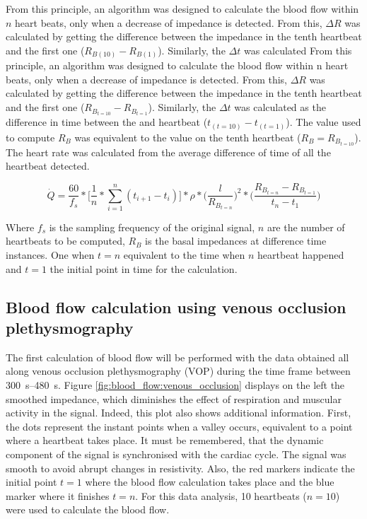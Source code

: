 From this principle, an algorithm was designed to calculate the blood flow within $n$ heart beats, only when a decrease of impedance is detected. From this, $\Delta R$ was calculated by getting the difference between the impedance in the tenth heartbeat and the first one ($R_{B(10)} - R_{B(1)}$).  Similarly, the $\Delta t$ was calculated From this principle, an algorithm was designed to calculate the blood flow within n heart beats, only when a decrease of impedance is detected. From this, $\Delta R$ was calculated by getting the difference between the impedance in the tenth heartbeat and the first one ($R_{B_{t=10}} - R_{B_{t=1}}$).  Similarly, the $\Delta t$ was calculated as the difference in time between the   and  heartbeat ($t_{(t=10)} - t_{(t=1)}$). The value used to compute $R_B$ was equivalent to the value on the tenth heartbeat ($R_B = R_{B_{t=10}}$). The heart rate was calculated from the average difference of time of all the heartbeat detected.

\begin{equation}
\label{eq:QL}
\dot{Q} = \frac{60}{f_s}*\Bigg[\frac{1}{n}*\sum_{i=1}^{n}(t_{i+1} - t_{i}) \Bigg] * \rho * \Bigg( \frac{l}{R_{B_{t=n}}} \Bigg) ^2 *\Bigg(\frac{R_{B_{t=n}}-R_{B_{t=1}}}{t_{n}-t_{1}}\Bigg)
\end{equation}


Where $f_s$ is the sampling frequency of the original signal, $n$ are the number of heartbeats to be computed, $R_B$ is the basal impedances at difference time instances. One when $t=n$ equivalent to the time when $n$ heartbeat happened and $t=1$ the initial point in time for the calculation. 

\subsection{Blood flow calculation using venous occlusion plethysmography}
\label{section occlusion 2.1}
The first calculation of blood flow will be performed with the data obtained all along venous occlusion plethysmography (VOP) during the time frame between \SIrange{300}{480}{\second}. Figure \ref{fig:blood_flow:venous_occlusion} displays on the left the smoothed impedance, which diminishes the effect of respiration and muscular activity in the signal. Indeed, this plot also shows additional information. First, the dots represent the instant points when a valley occurs, equivalent to a point where a heartbeat takes place. It must be remembered, that the dynamic component of the signal is synchronised with the cardiac cycle. The signal was smooth to avoid abrupt changes in resistivity. Also, the red markers indicate the initial point $t=1$ where the blood flow calculation takes place and the blue marker where it finishes $t=n$. For this data analysis, 10 heartbeats ($n=10$) were used to calculate the blood flow.

